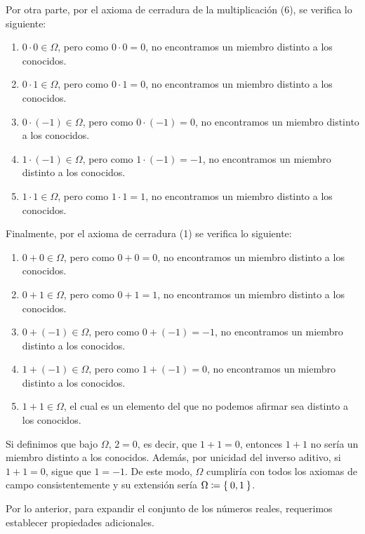 \documentclass[11pt]{article}
\newcommand{\defined}{\coloneqq}
\let\set\Set
\begin{document}
Por otra parte, por el axioma de cerradura de la multiplicación (6), se verifica lo siguiente:

\begin{enumerate}[label=\roman*)]
 \item $0\cdot 0\in \Omega$, pero como $0\cdot 0=0$, no encontramos un miembro distinto a los conocidos.
 \item $0 \cdot 1 \in \Omega$, pero como $0\cdot 1=0$, no encontramos un miembro distinto a los conocidos. 
 \item $0 \cdot (-1) \in \Omega$, pero como $0\cdot (-1)=0$, no encontramos un miembro distinto a los conocidos.
 \item $1\cdot (-1) \in \Omega$, pero como $1\cdot (-1)=-1$, no encontramos un miembro distinto a los conocidos.
 \item $1\cdot 1\in \Omega$, pero como $1\cdot 1=1$, no encontramos un miembro distinto a los conocidos.
\end{enumerate}
Finalmente, por el axioma de cerradura (1) se verifica lo siguiente:
\begin{enumerate}[label=\roman*)]
 \item $0+0 \in \Omega$, pero como $0+0=0$, no encontramos un miembro distinto a los conocidos.
 \item $0+1 \in \Omega$, pero como $0+1=1$, no encontramos un miembro distinto a los conocidos.
 \item $0+(-1) \in \Omega$, pero como $0+(-1)=-1$, no encontramos un miembro distinto a los conocidos.
 \item $1+(-1)\in \Omega$, pero como $1+(-1)=0$, no encontramos un miembro distinto a los conocidos.
 \item$1+1\in \Omega$, el cual es un elemento del que no podemos afirmar sea distinto a los conocidos.
\end{enumerate}
Si definimos que bajo $\Omega$, $2=0$, es decir, que $1+1=0$, entonces $1+1$ no sería un miembro distinto a los conocidos. Además, por unicidad del inverso aditivo, si $1+1=0$, sigue que $1=-1$. De este modo, $\Omega$ cumpliría con todos los axiomas de campo consistentemente y su extensión sería $\Omega \defined \set{0,1}$.

Por lo anterior, para expandir el conjunto de los números reales, requerimos establecer propiedades adicionales.
%
\end{document}
